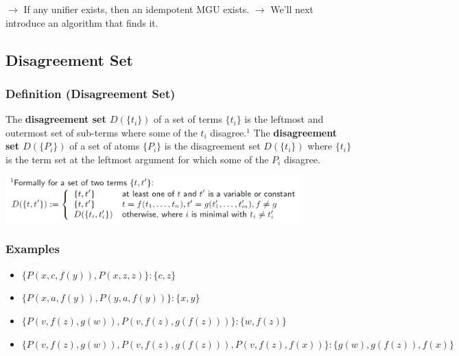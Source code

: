\documentclass[conference]{styles/acmsiggraph}
\begin{document}
        $\rightarrow$ If any unifier exists, then an idempotent MGU exists.\newline
        $\rightarrow$ We'll next introduce an algorithm that finds it.
        
    \subsection{Disagreement Set}
        \subsubsection{Definition (Disagreement Set)}
            The \textbf{disagreement set $D(\{t_i\})$} of a set of terms $\{t_i\}$ is the leftmost and outermost set of sub-terms where some of the $t_i$ disagree.$^1$\newline
            The \textbf{disagreement set $D(\{P_i\})$} of a set of atoms $\{P_i\}$ is the disagreement set $D(\{t_i\})$ where $\{t_i\}$ is the term set at the leftmost argument for which some of the $P_i$ disagree.
        
        \includegraphics[width=0.85\textwidth]{imgs/DisagreementSet.png}
        
        \subsubsection{Examples}
            \begin{itemize}
                \item $\{P(x,c,f(y)),P(x,z,z)\}: \{c,z\}$
                \item $\{P(x,a,f(y)),P(y,a,f(y))\}: \{x,y\}$
                \item $\{P(v,f(z),g(w)),P(v,f(z),g(f(z)))\}: \{w,f(z)\}$
                \item $\{P(v,f(z),g(w)),P(v,f(z),g(f(z))),P(v,f(z),f(x))\}: \{g(w),g(f(z)),f(x)\}$
            \end{itemize}

\newpage
\end{document}
